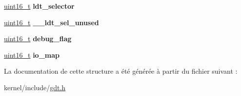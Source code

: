 \begin{DoxyCompactItemize}
\item 
\hypertarget{structtss_a934b41d2a63e759757d3afa0fab227c1}{\hyperlink{kernel_2include_2types_8h_adf4d876453337156dde61095e1f20223}{uint16\+\_\+t} {\bfseries ldt\+\_\+selector}}\label{structtss_a934b41d2a63e759757d3afa0fab227c1}

\item 
\hypertarget{structtss_a927509e57cfd273e377cec7368aedb50}{\hyperlink{kernel_2include_2types_8h_adf4d876453337156dde61095e1f20223}{uint16\+\_\+t} {\bfseries \+\_\+\+\_\+ldt\+\_\+sel\+\_\+unused}}\label{structtss_a927509e57cfd273e377cec7368aedb50}

\item 
\hypertarget{structtss_acfac9fc24de46f84d90c08d1b9b439e3}{\hyperlink{kernel_2include_2types_8h_adf4d876453337156dde61095e1f20223}{uint16\+\_\+t} {\bfseries debug\+\_\+flag}}\label{structtss_acfac9fc24de46f84d90c08d1b9b439e3}

\item 
\hypertarget{structtss_a25381c4288df77c8ab283299a1a288e8}{\hyperlink{kernel_2include_2types_8h_adf4d876453337156dde61095e1f20223}{uint16\+\_\+t} {\bfseries io\+\_\+map}}\label{structtss_a25381c4288df77c8ab283299a1a288e8}

\end{DoxyCompactItemize}


La documentation de cette structure a été générée à partir du fichier suivant \+:\begin{DoxyCompactItemize}
\item 
kernel/include/\hyperlink{gdt_8h}{gdt.\+h}\end{DoxyCompactItemize}
